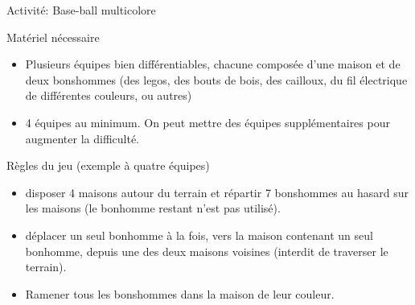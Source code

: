 \begin{frame}{Activité: Base-ball multicolore}
  \begin{block}{Matériel nécessaire}
    \begin{itemize}
    \item Plusieurs équipes bien différentiables, chacune composée d'une maison et de deux bonshommes (des legos, des bouts de bois, des cailloux, du fil électrique de différentes couleurs, ou autres) 
    \item 4 équipes au minimum. On peut mettre des équipes supplémentaires pour augmenter la difficulté.
    \end{itemize}
  \end{block}

  \begin{block}{Règles du jeu (exemple à quatre équipes)}
    \begin{itemize}
      \item {} disposer 4 maisons autour du terrain et répartir 7 bonshommes au hasard sur les maisons (le bonhomme restant n'est pas utilisé).
      \item {} déplacer un seul bonhomme à la fois, vers la maison contenant un seul bonhomme, depuis une des deux maisons voisines (interdit de traverser le terrain).
    \item  {} Ramener tous les bonshommes dans la maison de leur couleur.
    \end{itemize}
  \end{block}

  \bigskip


\end{frame}

